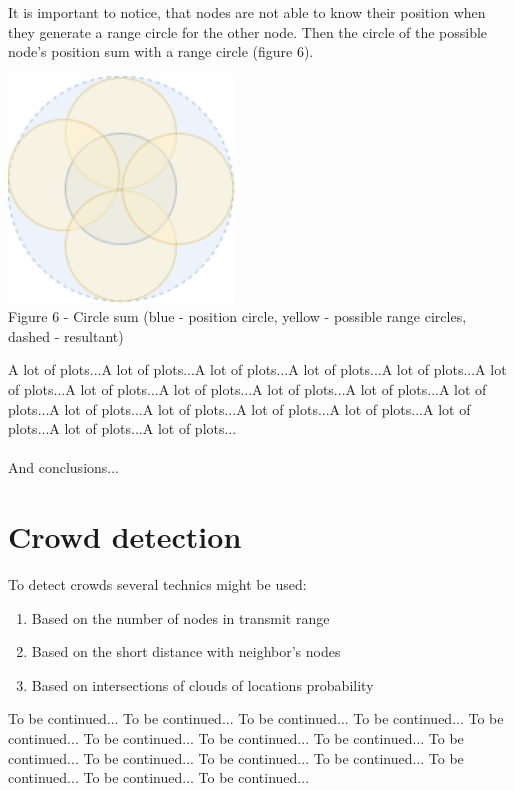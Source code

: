 \documentclass[12pt,a4paper]{report}
\begin{document}
It is important to notice, that nodes are not able to know their position when they generate a range circle for the other node. Then the circle of the possible node's position sum with a range circle (figure 6).
\begin{center}
    \includegraphics[width=6cm]{img/sum.png}\\
    Figure 6 - Circle sum (blue - position circle, yellow - possible range circles, dashed - resultant)
\end{center}

A lot of plots...A lot of plots...A lot of plots...A lot of plots...A lot of plots...A lot of plots...A lot of plots...A lot of plots...A lot of plots...A lot of plots...A lot of plots...A lot of plots...A lot of plots...A lot of plots...A lot of plots...A lot of plots...A lot of plots...A lot of plots...\\\\
And conclusions...
\section*{Crowd detection}
To detect crowds several technics might be used:
\begin{enumerate}
    \item Based on the number of nodes in transmit range
    \item Based on the short distance with neighbor's nodes
    \item Based on intersections of clouds of locations probability
\end{enumerate}
To be continued...  To be continued...  To be continued...  To be continued...  To be continued...  To be continued...  To be continued...  To be continued...  To be continued...  To be continued...  To be continued...  To be continued...  To be continued...  To be continued...  To be continued...  
\end{document}
